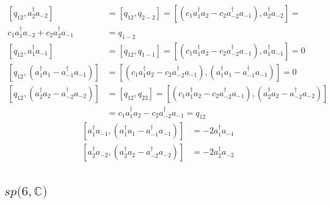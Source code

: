 \documentclass[aps,preprint]{revtex4}%
\begin{document}
\begin{align}
\left[  q_{12},a_{2}^{\dagger}a_{-2}\right]   &  =\left[  q_{12}%
,q_{2-2}\right]  =\left[  \left(  c_{1}a_{1}^{\dagger}a_{2}-c_{2}%
a_{-2}^{\dagger}a_{-1}\right)  ,a_{2}^{\dagger}a_{-2}\right]  =\nonumber\\
c_{1}a_{1}^{\dagger}a_{-2}+c_{2}a_{2}^{\dagger}a_{-1}  &  =q_{1-2}\nonumber\\
\left[  q_{12},a_{1}^{\dagger}a_{-1}\right]   &  =\left[  q_{12}%
,q_{1-1}\right]  =\left[  \left(  c_{1}a_{1}^{\dagger}a_{2}-c_{2}%
a_{-2}^{\dagger}a_{-1}\right)  ,a_{1}^{\dagger}a_{-1}\right]  =0\nonumber\\
\left[  q_{12},\left(  a_{1}^{\dagger}a_{1}-a_{-1}^{\dagger}a_{-1}\right)
\right]   &  =\left[  \left(  c_{1}a_{1}^{\dagger}a_{2}-c_{2}a_{-2}^{\dagger
}a_{-1}\right)  ,\left(  a_{1}^{\dagger}a_{1}-a_{-1}^{\dagger}a_{-1}\right)
\right]  =0\nonumber\\
\left[  q_{12},\left(  a_{2}^{\dagger}a_{2}-a_{-2}^{\dagger}a_{-2}\right)
\right]   &  =\left[  q_{12},q_{22}\right]  =\left[  \left(  c_{1}%
a_{1}^{\dagger}a_{2}-c_{2}a_{-2}^{\dagger}a_{-1}\right)  ,\left(
a_{2}^{\dagger}a_{2}-a_{-2}^{\dagger}a_{-2}\right)  \right] \nonumber\\
&  =c_{1}a_{1}^{\dagger}a_{2}-c_{2}a_{-2}^{\dagger}a_{-1}=q_{12}%
\end{align}%
\begin{align}
\left[  a_{1}^{\dagger}a_{-1},\left(  a_{1}^{\dagger}a_{1}-a_{-1}^{\dagger
}a_{-1}\right)  \right]   &  =-2a_{1}^{\dagger}a_{-1}\\
\left[  a_{2}^{\dagger}a_{-2},\left(  a_{2}^{\dagger}a_{2}-a_{-2}^{\dagger
}a_{-2}\right)  \right]   &  =-2a_{2}^{\dagger}a_{-2}%
\end{align}


\subsection{$sp(6,\mathbb{C)}$}
\end{document}
